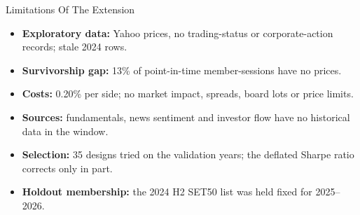 \begin{frame}{Limitations Of The Extension}
\begin{itemize}
  \item \textbf{Exploratory data:} Yahoo prices, no trading-status or corporate-action records; stale 2024 rows.
  \item \textbf{Survivorship gap:} 13\% of point-in-time member-sessions have no prices.
  \item \textbf{Costs:} 0.20\% per side; no market impact, spreads, board lots or price limits.
  \item \textbf{Sources:} fundamentals, news sentiment and investor flow have no historical data in the window.
  \item \textbf{Selection:} 35 designs tried on the validation years; the deflated Sharpe ratio corrects only in part.
  \item \textbf{Holdout membership:} the 2024 H2 SET50 list was held fixed for 2025--2026.
\end{itemize}
\end{frame}
